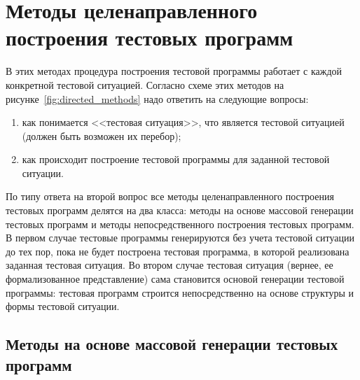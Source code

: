 \section{Методы целенаправленного построения тестовых программ}


В этих методах процедура построения тестовой программы работает с каждой конкретной тестовой ситуацией. Согласно схеме этих методов на рисунке~\ref{fig:directed_methods} надо ответить на следующие вопросы:
\begin{enumerate}
  \item как понимается <<тестовая ситуация>>, что является тестовой ситуацией (должен быть возможен их перебор);
  \item как происходит построение тестовой программы для заданной тестовой ситуации.
\end{enumerate}

По типу ответа на второй вопрос все методы целенаправленного построения тестовых программ делятся на два класса: методы на основе массовой генерации тестовых программ и методы непосредственного построения тестовых программ. В первом случае тестовые программы генерируются без учета тестовой ситуации до тех пор, пока не будет построена тестовая программа, в которой реализована заданная тестовая ситуация. Во втором случае тестовая ситуация (вернее, ее формализованное представление) сама становится основой генерации тестовой программы: тестовая программ строится непосредственно на основе структуры и формы тестовой ситуации.

\subsection{Методы на основе массовой генерации тестовых программ}

